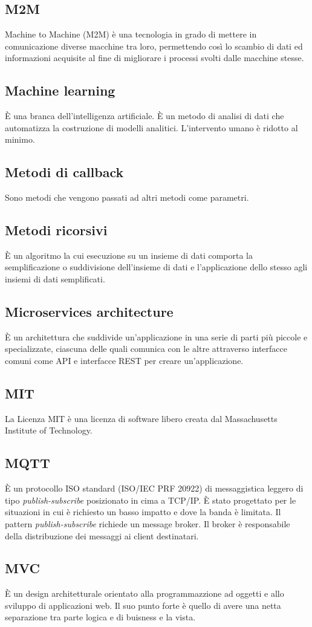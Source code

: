 \section{}

\subsection*{M2M} Machine to Machine (M2M) è una tecnologia in grado di mettere in comunicazione diverse macchine tra loro, permettendo così lo scambio di dati ed informazioni acquisite al fine di migliorare i processi svolti dalle macchine stesse.

\subsection*{Machine learning} È una branca dell'intelligenza artificiale. È un metodo di analisi di dati che automatizza la costruzione di modelli analitici. L'intervento umano è ridotto al minimo.

\subsection*{Metodi di callback} Sono metodi che vengono passati ad altri metodi come parametri.

\subsection*{Metodi ricorsivi} È un algoritmo la cui esecuzione su un insieme di dati comporta la semplificazione o suddivisione dell'insieme di dati e l'applicazione dello stesso agli insiemi di dati semplificati.

\subsection*{Microservices architecture} È un architettura che suddivide un’applicazione in una serie di parti più piccole e specializzate, ciascuna delle quali comunica con le altre attraverso interfacce comuni come API e interfacce REST per creare un’applicazione.

\subsection*{MIT} La Licenza MIT è una licenza di software libero creata dal Massachusetts Institute of Technology.

\subsection*{MQTT} È un protocollo ISO standard (ISO/IEC PRF 20922) di messaggistica leggero di tipo \textit{publish-subscribe} posizionato in cima a TCP/IP. È stato progettato per le situazioni in cui è richiesto un basso impatto e dove la banda è limitata. Il pattern \textit{publish-subscribe} richiede un message broker. Il broker è responsabile della distribuzione dei messaggi ai client destinatari.

\subsection*{MVC} È un design architetturale orientato alla programmazzione ad oggetti  e allo sviluppo di applicazioni web. Il suo punto forte è quello di avere una netta separazione tra parte logica e di buisness e la vista.